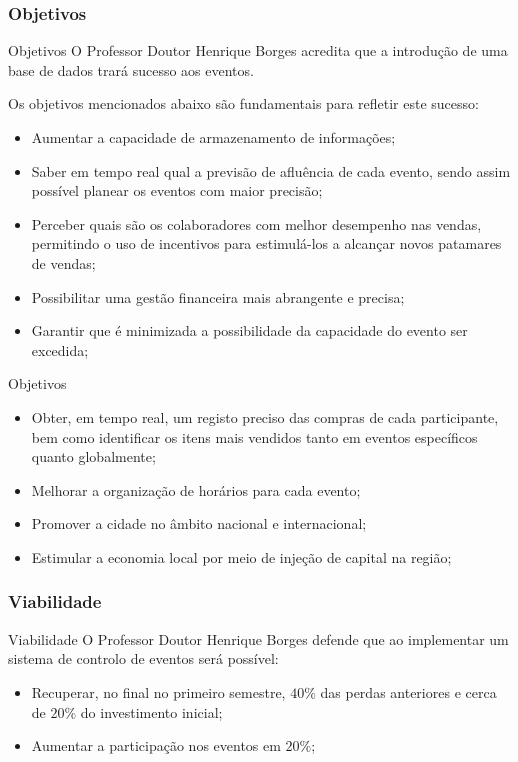 \documentclass[compress,svgnames,handout,13.7pt]{beamer}
\begin{document}
\subsubsection{Objetivos}
\begin{frame}{Objetivos}
    O Professor Doutor Henrique Borges acredita que a introdu\c{c}\~{a}o de uma base de dados
    trar\'{a} sucesso aos eventos.

    Os objetivos mencionados abaixo s\~{a}o fundamentais para refletir este sucesso:
    \begin{itemize}
    \item Aumentar a capacidade de armazenamento de informa\c{c}\~{o}es;
    \item Saber em tempo real qual a previsão de afluência de cada evento, sendo assim possível
planear os eventos com maior precisão;
    \item Perceber quais são os colaboradores com melhor desempenho nas vendas, permitindo o
uso de incentivos para estimulá-los a alcançar novos patamares de vendas;
    \item Possibilitar uma gestão financeira mais abrangente e precisa;
    \item Garantir que é minimizada a possibilidade da capacidade do evento ser excedida;
    \end{itemize}
\end{frame}
\begin{frame}{Objetivos}
    \begin{itemize}
        \item Obter, em tempo real, um registo preciso das compras de cada participante, bem como
identificar os itens mais vendidos tanto em eventos específicos quanto globalmente;
        \item Melhorar a organiza\c{c}\~{a}o de hor\'{a}rios para cada evento;
        \item Promover a cidade no \^{a}mbito nacional e internacional;
        \item Estimular a economia local por meio de inje\c{c}\~{a}o de capital na regi\~{a}o;
    \end{itemize}
\end{frame}

\subsubsection{Viabilidade}
\begin{frame}{Viabilidade}
O Professor Doutor Henrique Borges defende que ao implementar um sistema de controlo de eventos
        será possível: 
        \begin{itemize}
          \item Recuperar, no final no primeiro semestre, $40\%$ das perdas anteriores e cerca de $20\%$
            do investimento inicial;
          \item Aumentar a participação nos eventos em $20\%$;
        \end{itemize}
\end{frame}
\end{document}

